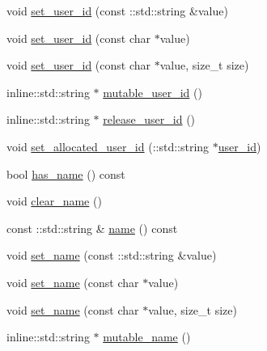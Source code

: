 \begin{DoxyCompactItemize}
\item 
void \hyperlink{class_i_m_1_1_base_define_1_1_client_user_info_ab00e4b1771eb2373558577f2ddf6bbc9}{set\+\_\+user\+\_\+id} (const \+::std\+::string \&value)
\item 
void \hyperlink{class_i_m_1_1_base_define_1_1_client_user_info_ad358fda936ae1cefc585811d2efabd36}{set\+\_\+user\+\_\+id} (const char $\ast$value)
\item 
void \hyperlink{class_i_m_1_1_base_define_1_1_client_user_info_a8eac8f6389962e387c82249267fd1e59}{set\+\_\+user\+\_\+id} (const char $\ast$value, size\+\_\+t size)
\item 
inline\+::std\+::string $\ast$ \hyperlink{class_i_m_1_1_base_define_1_1_client_user_info_a0da064af5f5a6da9631017ec0f62a47c}{mutable\+\_\+user\+\_\+id} ()
\item 
inline\+::std\+::string $\ast$ \hyperlink{class_i_m_1_1_base_define_1_1_client_user_info_aff36d9b208e8e782d6bc922d51627478}{release\+\_\+user\+\_\+id} ()
\item 
void \hyperlink{class_i_m_1_1_base_define_1_1_client_user_info_a67e64c3e71a414d4a482c5f8d22a2846}{set\+\_\+allocated\+\_\+user\+\_\+id} (\+::std\+::string $\ast$\hyperlink{class_i_m_1_1_base_define_1_1_client_user_info_aec41f6b5430b803a0f133fad27d678a8}{user\+\_\+id})
\item 
bool \hyperlink{class_i_m_1_1_base_define_1_1_client_user_info_a503f9ab61d6c09015a2b9644380a4fdc}{has\+\_\+name} () const 
\item 
void \hyperlink{class_i_m_1_1_base_define_1_1_client_user_info_ae92f8517012869b0786538a340209d34}{clear\+\_\+name} ()
\item 
const \+::std\+::string \& \hyperlink{class_i_m_1_1_base_define_1_1_client_user_info_a0d5ddf534d63265f08b921de140b1be5}{name} () const 
\item 
void \hyperlink{class_i_m_1_1_base_define_1_1_client_user_info_aff710f68614cc718f5c71ca58ab5258f}{set\+\_\+name} (const \+::std\+::string \&value)
\item 
void \hyperlink{class_i_m_1_1_base_define_1_1_client_user_info_a15638385d1900de9c35db4c514d8bde7}{set\+\_\+name} (const char $\ast$value)
\item 
void \hyperlink{class_i_m_1_1_base_define_1_1_client_user_info_a047dbbbb340cc21a1a9e7fd8d512790b}{set\+\_\+name} (const char $\ast$value, size\+\_\+t size)
\item 
inline\+::std\+::string $\ast$ \hyperlink{class_i_m_1_1_base_define_1_1_client_user_info_a2e42a83cfbba358b604dddc6f6acf506}{mutable\+\_\+name} ()

\end{DoxyCompactItemize}
